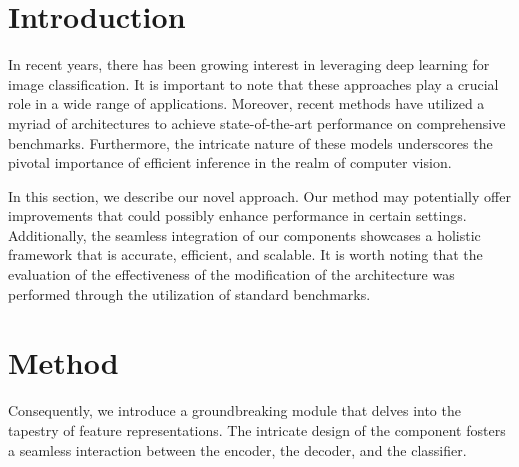 \documentclass{article}
\begin{document}
\section{Introduction}
In recent years, there has been growing interest in leveraging deep learning for
image classification. It is important to note that these approaches play a crucial
role in a wide range of applications. Moreover, recent methods have utilized
a myriad of architectures to achieve state-of-the-art performance on comprehensive
benchmarks. Furthermore, the intricate nature of these models underscores the
pivotal importance of efficient inference in the realm of computer vision.

In this section, we describe our novel approach. Our method may potentially offer
improvements that could possibly enhance performance in certain settings.
Additionally, the seamless integration of our components showcases a holistic
framework that is accurate, efficient, and scalable. It is worth noting that the
evaluation of the effectiveness of the modification of the architecture was
performed through the utilization of standard benchmarks.

\section{Method}
Consequently, we introduce a groundbreaking module that delves into the tapestry
of feature representations. The intricate design of the component fosters a
seamless interaction between the encoder, the decoder, and the classifier.
\end{document}
